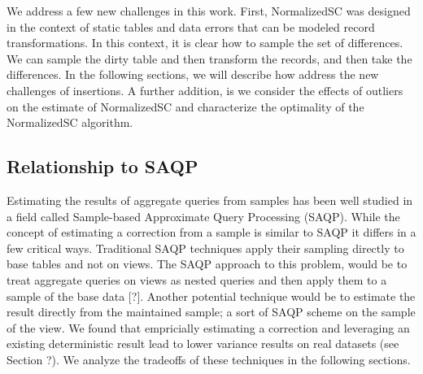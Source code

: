 We address a few new challenges in this work. First, NormalizedSC
was designed in the context of static tables and data errors that
can be modeled record transformations. In this context, it is clear
how to sample the set of differences. We can sample the dirty table
and then transform the records, and then take the differences. In
the following sections, we will describe how address the new challenges
of insertions. A further addition, is we consider the effects of outliers
on the estimate of NormalizedSC and characterize the optimality of
the NormalizedSC algorithm.


\subsection{Relationship to SAQP}

Estimating the results of aggregate queries from samples has been
well studied in a field called Sample-based Approximate Query Processing
(SAQP). While the concept of estimating a correction from a sample
is similar to SAQP it differs in a few critical ways. Traditional
SAQP techniques apply their sampling directly to base tables and not
on views. The SAQP approach to this problem, would be to treat aggregate
queries on views as nested queries and then apply them to a sample
of the base data {[}?{]}. Another potential technique would be to
estimate the result directly from the maintained sample; a sort of
SAQP scheme on the sample of the view. We found that empricially estimating
a correction and leveraging an existing deterministic result lead
to lower variance results on real datasets (see Section ?). We analyze
the tradeoffs of these techniques in the following sections.
